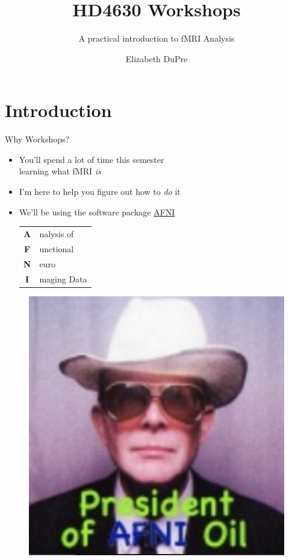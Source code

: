 \documentclass[t,12pt]{beamer}
\title{HD4630 Workshops}
\subtitle{A practical introduction to fMRI Analysis}
\author{Elizabeth DuPre \\[.8\baselineskip]}
\institute{Human Neuroscience Institute 
\\[4pt]
\href{http://www.human.cornell.edu/hd/}{Department of Human Development}
\\[4pt]
\href{https://www.cornell.edu/}{Cornell University}}
\date{}
\begin{document}
\begin{frame}
  \titlepage
\end{frame}

\section{Introduction}
\begin{frame}{Why Workshops?}
\vspace{4pt}
\begin{itemize}
\setlength\itemsep{0.75em}
  \item You'll spend a lot of time this semester \\
  learning what fMRI \textit{is}
  \item I'm here to help you figure out how to \textit{do} it
  \item We'll be using the software package \href{https://afni.nimh.nih.gov/afni/}{AFNI} \\
  \vspace{4pt}
  \begin{tabular}{c l}
	 \textbf{A} & nalysis of  \\
	 \textbf{F} & unctional   \\
     \textbf{N} & euro        \\
     \textbf{I} & maging Data \\
  \end{tabular}
\end{itemize}
\begin{figure}
\raggedleft
\includegraphics[width=.275\textwidth]{images/AFNIman.png}
\end{figure}
\end{frame}
\end{document}
